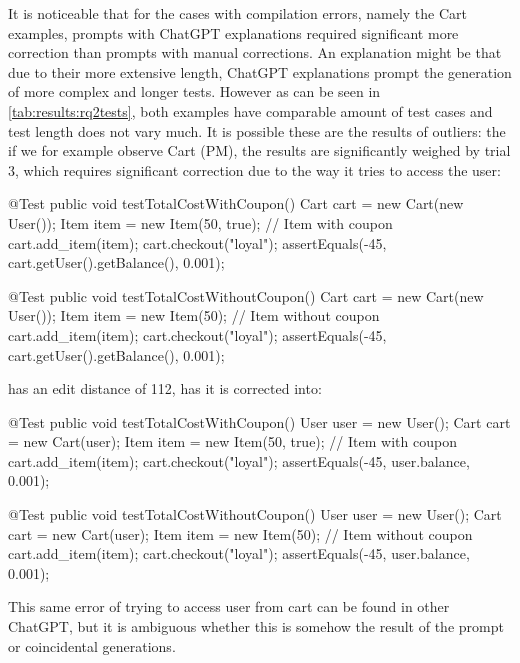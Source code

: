 It is noticeable that for the cases with compilation errors, namely the Cart examples, prompts with ChatGPT explanations
required significant more correction than prompts with manual corrections. An explanation might be that due to their more
extensive length, ChatGPT explanations prompt the generation of more complex and longer tests. However as can be seen in
\cref{tab:results:rq2tests}, both examples have comparable amount of test cases and test length does not vary much.
It is possible these are the results of outliers: the if we for example observe Cart (PM), the results are significantly weighed by
trial 3, which requires significant correction due to the way it tries to access the user:
\begin{answer}
    @Test
    public void testTotalCostWithCoupon() {
        Cart cart = new Cart(new User());
        Item item = new Item(50, true); // Item with coupon
        cart.add_item(item);
        cart.checkout("loyal");
        assertEquals(-45, cart.getUser().getBalance(), 0.001);
    }

    @Test
    public void testTotalCostWithoutCoupon() {
        Cart cart = new Cart(new User());
        Item item = new Item(50); // Item without coupon
        cart.add_item(item);
        cart.checkout("loyal");
        assertEquals(-45, cart.getUser().getBalance(), 0.001);
    }
\end{answer}
has an edit distance of 112, has it is corrected into:
\begin{answer}
    @Test
    public void testTotalCostWithCoupon() {
        User user = new User();
        Cart cart = new Cart(user);
        Item item = new Item(50, true); // Item with coupon
        cart.add_item(item);
        cart.checkout("loyal");
        assertEquals(-45, user.balance, 0.001);
    }

    @Test
    public void testTotalCostWithoutCoupon() {
        User user = new User();
        Cart cart = new Cart(user);
        Item item = new Item(50); // Item without coupon
        cart.add_item(item);
        cart.checkout("loyal");
        assertEquals(-45, user.balance, 0.001);
    }
\end{answer}
This same error of trying to access user from cart can be found in other ChatGPT, but it is ambiguous
whether this is somehow the result of the prompt or coincidental generations.

